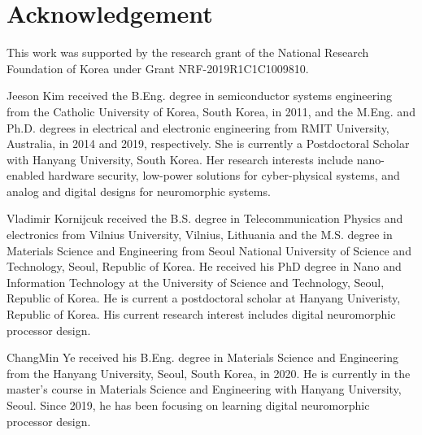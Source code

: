 \documentclass[10pt,journal]{IEEEtran}
\begin{document}



\section*{Acknowledgement}
This work was supported by the research grant of the National Research Foundation of Korea under Grant NRF-2019R1C1C1009810.



\begin{IEEEbiography}{Jeeson Kim} received the B.Eng. degree in semiconductor systems engineering from the Catholic University of Korea, South Korea, in 2011, and the M.Eng. and Ph.D. degrees in electrical and electronic engineering from RMIT University, Australia, in 2014 and 2019, respectively. She is currently a Postdoctoral Scholar with Hanyang University, South Korea. Her research interests include nano-enabled hardware security, low-power solutions for cyber-physical systems, and analog and digital designs for neuromorphic systems.
\end{IEEEbiography}

\begin{IEEEbiography}{Vladimir Kornijcuk} received the B.S. degree in Telecommunication Physics and electronics from Vilnius University, Vilnius, Lithuania and the M.S. degree in Materials Science and Engineering from Seoul National University of Science and Technology, Seoul, Republic of Korea. He received his PhD degree in Nano and Information Technology at the University of Science and Technology, Seoul, Republic of Korea. He is current a postdoctoral scholar at Hanyang Univeristy, Republic of Korea. His current research interest includes digital neuromorphic processor design.
\end{IEEEbiography}

\begin{IEEEbiography}{ChangMin Ye}
received his B.Eng. degree in Materials Science and Engineering from the Hanyang University, Seoul, South Korea, in 2020. He is currently in the master\rq{}s course in Materials Science and Engineering with Hanyang University, Seoul. Since 2019, he has been focusing on learning digital neuromorphic processor design.
\end{IEEEbiography}
\end{document}

